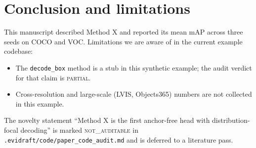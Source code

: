 \section{Conclusion and limitations}
\label{sec:conclusion}

This manuscript described Method X and reported its mean mAP across three
seeds on COCO and VOC. Limitations we are aware of in the current
example codebase:

\begin{itemize}
  \item The \texttt{decode\_box} method is a stub in this synthetic
        example; the audit verdict for that claim is \textsc{partial}.
  \item Cross-resolution and large-scale (LVIS, Objects365) numbers are
        not collected in this example.
\end{itemize}

The novelty statement ``Method X is the first anchor-free head with
distribution-focal decoding'' is marked \textsc{not\_auditable} in
\texttt{.evidraft/code/paper\_code\_audit.md} and is deferred to a
literature pass.
